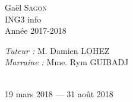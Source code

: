 \begin{titlepage}
\begin{sffamily}
\begin{center}
    \begin{minipage}{0.4\textwidth}
      \begin{flushleft} \large
        Gaël \textsc{Sagon}\\
       ING3 info \\
       Année 2017-2018\\
      \end{flushleft}
    \end{minipage}
    \begin{minipage}{0.4\textwidth}
      \begin{flushright} \large
        \emph{Tuteur :} M. Damien LOHEZ     \\
        \emph{Marraine :} Mme. Rym GUIBADJ\\
        ~\\
      \end{flushright}
    \end{minipage}

    \vfill

    {\large 19 mars 2018 — 31 août 2018}

  \end{center}
  \end{sffamily}
\end{titlepage}